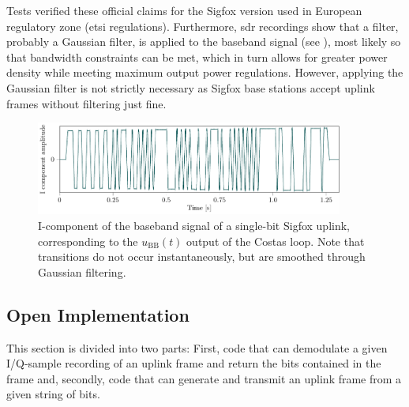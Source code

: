 Tests verified these official claims for the Sigfox version used in European regulatory zone (\gls{etsi} regulations).
Furthermore, \gls{sdr} recordings show that a filter, probably a Gaussian filter, is applied to the baseband signal (see ), most likely so that bandwidth constraints can be met, which in turn allows for greater power density while meeting maximum output power regulations.
However, applying the Gaussian filter is not strictly necessary as Sigfox base stations accept uplink frames without filtering just fine.

\begin{figure}[h]
	\centering
	\includegraphics[width=0.9\textwidth]{fig/uplink_baseband.pdf}
	\caption{I-component of the baseband signal of a single-bit Sigfox uplink, corresponding to the $u_\mathrm{BB}(t)$ output of the Costas loop. Note that transitions do not occur instantaneously, but are smoothed through Gaussian filtering.}
	\label{fig:uplink_baseband}
\end{figure}

\subsection{Open Implementation}
\label{sec:uplink_phy_reimp}
This section is divided into two parts: First, code that can demodulate a given I/Q-sample recording of an uplink frame and return the bits contained in the frame and, secondly, code that can generate and transmit an uplink frame from a given string of bits. 

